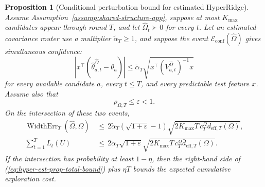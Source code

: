 \documentclass{article} %
\newtheorem{proposition}[theorem]{Proposition}
\renewcommand{\eqref}[1]{\textup{(\ref{#1})}}
\begin{document}
\begin{proposition}[Conditional perturbation bound for estimated HyperRidge]
\label{prop:hyper-estimated-perturbation}
Assume Assumption~\ref{assump:shared-structure-app}, suppose at most
\(K_{\max}\) candidates appear through round \(T\), and let
\(\widehat\Omega_t\succ0\) for every \(t\). Let an estimated-covariance router
use a multiplier \(\widetilde\alpha_T\ge1\), and suppose the event
\(\mathcal E_{\mathrm{conf}}(\widehat\Omega)\) gives simultaneous confidence:
\begin{equation}
\label{eq:hyper-est-prop-confidence}
\left|
x^\top
\left(
\widehat\theta_{a,t}^{\widehat\Omega}-\theta_a
\right)
\right|
\le
\widetilde\alpha_T
\sqrt{
x^\top
\left(V_{a,t}^{\widehat\Omega}\right)^{-1}
x
}
\end{equation}
for every available candidate \(a\), every \(t\le T\), and every predictable
test feature \(x\). Assume also that
\begin{equation}
\label{eq:hyper-est-prop-rho}
\rho_{\Omega,T}\le \varepsilon<1 .
\end{equation}
On the intersection of these two events,
\begin{align}
\operatorname{WidthErr}_T(\widehat{\Omega},\Omega)
&\,\leq\,
2\widetilde\alpha_T
\left(\sqrt{1+\varepsilon}-1\right)
\sqrt{
2K_{\max}T\,c_T^\Omega
\bar d_{\mathrm{eff},T}(\Omega)
},
\label{eq:hyper-est-prop-err-bound}
\\
\sum_{t=1}^{T}L_t(U)
&\,\leq\,
2\widetilde\alpha_T\sqrt{1+\varepsilon}
\sqrt{
2K_{\max}T\,c_T^\Omega
\bar d_{\mathrm{eff},T}(\Omega)
}.
\label{eq:hyper-est-prop-total-bound}
\end{align}
If the intersection has probability at least \(1-\eta\), then the right-hand
side of \eqref{eq:hyper-est-prop-total-bound} plus \(\eta T\) bounds the
expected cumulative exploration cost.
\end{proposition}
\end{document}
